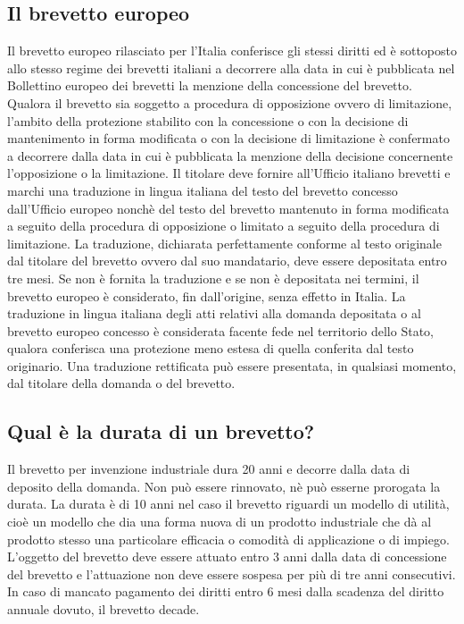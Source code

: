 \subsection{Il brevetto europeo}
Il brevetto europeo rilasciato per l'Italia conferisce gli stessi diritti ed è sottoposto allo stesso regime dei brevetti italiani a decorrere alla data
in cui è pubblicata nel Bollettino europeo dei brevetti la menzione della concessione del brevetto.\newline
Qualora il brevetto sia soggetto a procedura di opposizione ovvero di limitazione, l'ambito della protezione stabilito con la concessione o con la decisione
di mantenimento in forma modificata o con la decisione di limitazione è confermato a decorrere dalla data in cui è pubblicata la menzione della decisione
concernente l'opposizione o la limitazione. \newline
Il titolare deve fornire all'Ufficio italiano brevetti e marchi una traduzione in lingua italiana del testo del brevetto concesso dall'Ufficio europeo
nonchè del testo del brevetto mantenuto in forma modificata a seguito della procedura di opposizione o limitato a seguito della procedura di limitazione.\newline
La traduzione, dichiarata perfettamente conforme al testo originale dal titolare del brevetto ovvero dal suo mandatario, deve essere depositata entro tre mesi. \newline
Se non è fornita la traduzione e se non è depositata nei termini, il brevetto europeo è considerato, fin dall'origine,
senza effetto in Italia.\newline
La traduzione in lingua italiana degli atti relativi alla domanda depositata o al brevetto europeo concesso è considerata facente fede nel territorio dello
Stato, qualora conferisca una protezione meno estesa di quella conferita dal testo originario. Una traduzione rettificata può essere presentata, in qualsiasi momento, dal
titolare della domanda o del brevetto.

\subsection{Qual è la durata di un brevetto?}
Il brevetto per invenzione industriale dura 20 anni e decorre dalla data di deposito della domanda. \newline
Non può essere rinnovato, nè può esserne prorogata la durata.\newline
La durata è di 10 anni nel caso il brevetto riguardi un modello di utilità, cioè un modello che dia una forma nuova di un
prodotto industriale che dà al prodotto stesso una particolare efficacia o comodità di applicazione o di impiego. \newline
L'oggetto del brevetto deve essere attuato entro 3 anni dalla data di concessione del brevetto e l'attuazione non deve essere sospesa per più
di tre anni consecutivi.\newline
In caso di mancato pagamento dei diritti entro 6 mesi dalla scadenza del diritto annuale dovuto, il brevetto decade.

